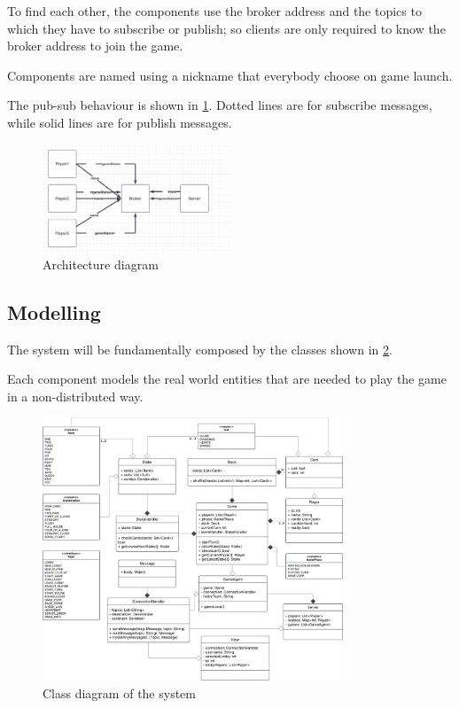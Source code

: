 \documentclass{scrartcl}
\begin{document}
To find each other, the components use the broker address and the topics to which they have to
subscribe or publish; so clients are only required to know the broker address to join the game.

Components are named using a nickname that everybody choose on game launch.

The pub-sub behaviour is shown in \cref{fig:pubsubdiagram}. Dotted lines are for subscribe messages,
while solid lines are for publish messages.

\begin{figure}
      \centering
      \includegraphics[width=0.5\textwidth]{figures/pubsubdiagram.png}
      \caption{Architecture diagram}
      \label{fig:pubsubdiagram}
\end{figure}

\subsection{Modelling}\label{modelling}
The system will be fundamentally composed by the classes shown in \cref{fig:classes}.

Each component models the real world entities that are needed to play the game in a non-distributed
way.
\begin{figure}
      \centering
      \includegraphics[width=0.8\textwidth]{figures/classes.png}
      \caption{Class diagram of the system}
      \label{fig:classes}
\end{figure}
\end{document}
